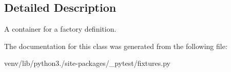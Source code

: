 \subsection{Detailed Description}
\begin{DoxyVerb}A container for a factory definition. \end{DoxyVerb}
 

The documentation for this class was generated from the following file\+:\begin{DoxyCompactItemize}
\item 
venv/lib/python3./site-\/packages/\+\_\+pytest/fixtures.\+py\end{DoxyCompactItemize}
